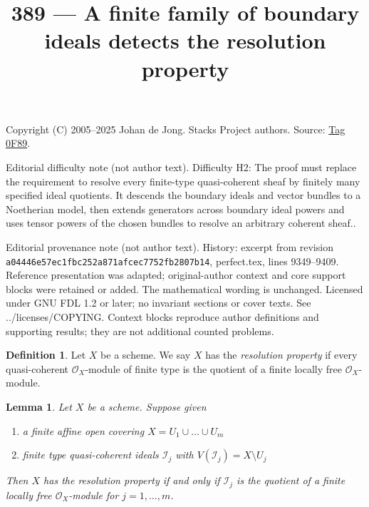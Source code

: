 \documentclass{amsart}
\theoremstyle{plain}
\newtheorem{lemma}[subsection]{Lemma}
\theoremstyle{definition}
\newtheorem{definition}[subsection]{Definition}
\theoremstyle{remark}
\numberwithin{equation}{subsection}
\begin{document}
\title[Stacks Project, Tag 0F89]{389 --- A finite family of boundary ideals detects the resolution property}
\maketitle
\noindent Copyright (C) 2005--2025 Johan de Jong. Stacks Project authors. Source: \href{https://stacks.math.columbia.edu/tag/0F89}{Tag 0F89}.

\noindent Editorial difficulty note (not author text). Difficulty H2: The proof must replace the requirement to resolve every finite-type quasi-coherent sheaf by finitely many specified ideal quotients. It descends the boundary ideals and vector bundles to a Noetherian model, then extends generators across boundary ideal powers and uses tensor powers of the chosen bundles to resolve an arbitrary coherent sheaf..

\noindent Editorial provenance note (not author text). History: excerpt from revision \texttt{a0444\allowbreak 6e57e\allowbreak c1fbc\allowbreak 252a8\allowbreak 71afc\allowbreak ec775\allowbreak 2fb28\allowbreak 07b14}, perfect.tex, lines 9349--9409. Reference presentation was adapted; original-author context and core support blocks were retained or added. The mathematical wording is unchanged. Licensed under GNU FDL 1.2 or later; no invariant sections or cover texts. See ../licenses/COPYING. Context blocks reproduce author definitions and supporting results; they are not additional counted problems.

\begin{definition}
\label{definition-resolution-property}
Let $X$ be a scheme. We say $X$ has the {\it resolution property}
if every quasi-coherent $\mathcal{O}_X$-module of finite type
is the quotient of a finite locally free $\mathcal{O}_X$-module.
\end{definition}

\begin{lemma}
\label{lemma-resolution-property-finite-number}
Let $X$ be a scheme. Suppose given
\begin{enumerate}
\item a finite affine open covering $X = U_1 \cup \ldots \cup U_m$
\item finite type quasi-coherent ideals $\mathcal{I}_j$
with $V(\mathcal{I}_j) = X \setminus U_j$
\end{enumerate}
Then $X$ has the resolution property if and only if $\mathcal{I}_j$
is the quotient of a finite locally free $\mathcal{O}_X$-module
for $j = 1, \ldots, m$.
\end{lemma}
\end{document}
